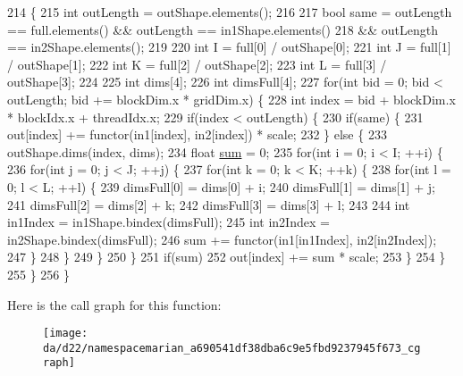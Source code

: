 \begin{DoxyCode}
214                                           \{
215   \textcolor{keywordtype}{int} outLength = outShape.elements();
216 
217   \textcolor{keywordtype}{bool} same = outLength == full.elements() && outLength == in1Shape.elements()
218               && outLength == in2Shape.elements();
219 
220   \textcolor{keywordtype}{int} I = full[0] / outShape[0];
221   \textcolor{keywordtype}{int} J = full[1] / outShape[1];
222   \textcolor{keywordtype}{int} K = full[2] / outShape[2];
223   \textcolor{keywordtype}{int} L = full[3] / outShape[3];
224 
225   \textcolor{keywordtype}{int} dims[4];
226   \textcolor{keywordtype}{int} dimsFull[4];
227   \textcolor{keywordflow}{for}(\textcolor{keywordtype}{int} bid = 0; bid < outLength; bid += blockDim.x * gridDim.x) \{
228     \textcolor{keywordtype}{int} index = bid + blockDim.x * blockIdx.x + threadIdx.x;
229     \textcolor{keywordflow}{if}(index < outLength) \{
230       \textcolor{keywordflow}{if}(same) \{
231         out[index] += functor(in1[index], in2[index]) * scale;
232       \} \textcolor{keywordflow}{else} \{
233         outShape.dims(index, dims);
234         \textcolor{keywordtype}{float} \hyperlink{namespacemarian_a460460a6de63beebc5d968b44d49d11b}{sum} = 0;
235         \textcolor{keywordflow}{for}(\textcolor{keywordtype}{int} i = 0; i < I; ++i) \{
236           \textcolor{keywordflow}{for}(\textcolor{keywordtype}{int} j = 0; j < J; ++j) \{
237             \textcolor{keywordflow}{for}(\textcolor{keywordtype}{int} k = 0; k < K; ++k) \{
238               \textcolor{keywordflow}{for}(\textcolor{keywordtype}{int} l = 0; l < L; ++l) \{
239                 dimsFull[0] = dims[0] + i;
240                 dimsFull[1] = dims[1] + j;
241                 dimsFull[2] = dims[2] + k;
242                 dimsFull[3] = dims[3] + l;
243 
244                 \textcolor{keywordtype}{int} in1Index = in1Shape.bindex(dimsFull);
245                 \textcolor{keywordtype}{int} in2Index = in2Shape.bindex(dimsFull);
246                 sum += functor(in1[in1Index], in2[in2Index]);
247               \}
248             \}
249           \}
250         \}
251         \textcolor{keywordflow}{if}(sum)
252           out[index] += sum * scale;
253       \}
254     \}
255   \}
256 \}
\end{DoxyCode}


Here is the call graph for this function\+:
\nopagebreak
\begin{figure}[H]
\begin{center}
\leavevmode
\texttt{[image: da/d22/namespacemarian\_a690541df38dba6c9e5fbd9237945f673\_cgraph]}
\end{center}
\end{figure}


